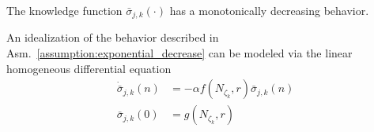 \begin{tcolorbox}
	\begin{assumption}\label{assumption:exponential_decrease} The knowledge function $\bar{\sigma}_{j,k}(\cdot)$ has a monotonically decreasing behavior.
	\end{assumption}
\end{tcolorbox} 
\noindent
An idealization of the behavior described in Asm.~\ref{assumption:exponential_decrease} can be modeled via the linear homogeneous differential equation
\begin{subequations}\label{eq:simple_knowledge_dynamics}
	\begin{alignat}{2}
		\dot{\bar{\sigma}}_{j,k}\left(n\right) &= -\alpha f\left(N_{\zeta_k},r\right) \bar{\sigma}_{j,k}\left(n\right)\\
		\bar{\sigma}_{j,k}(0) &= g\left(N_{\zeta_k},r\right)
	\end{alignat}
\end{subequations}

